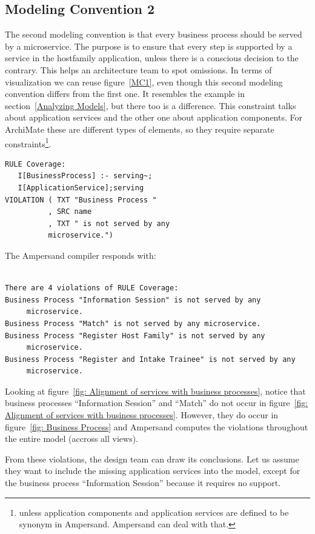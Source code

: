 \documentclass[sn-vancouver]{sn-jnl}%
\theoremstyle{thmstyleone}%
\theoremstyle{thmstyletwo}%
\theoremstyle{thmstylethree}%
\begin{document}
\subsection{Modeling Convention 2}
The second modeling convention is that every business process should be served by a microservice.
The purpose is to ensure that every step is supported by a service in the hostfamily application, unless there is a conscious decision to the contrary.
This helps an architecture team to spot omissions.
In terms of visualization we can reuse figure~\ref{MC1}, even though this second modeling convention differs from the first one.
It resembles the example in section~\ref{Analyzing Models}, but there too is a difference.
This constraint talks about application services and the other one about application components.
For ArchiMate these are different types of elements, so they require separate constraints\footnote{unless application components and application services are defined to be synonym in Ampersand. Ampersand can deal with that.}.

{\small
\begin{lstlisting}[frame=single, label={mc2}, caption={}]
RULE Coverage:
   I[BusinessProcess] :- serving~;
   I[ApplicationService];serving
VIOLATION ( TXT "Business Process "
          , SRC name
          , TXT " is not served by any 
          microservice.")
\end{lstlisting}
}

The Ampersand compiler responds with:

{\small
\begin{verbatim}

There are 4 violations of RULE Coverage:
Business Process "Information Session" is not served by any
     microservice.
Business Process "Match" is not served by any microservice.
Business Process "Register Host Family" is not served by any
     microservice.
Business Process "Register and Intake Trainee" is not served by any
     microservice.

\end{verbatim}
}

Looking at figure~\ref{fig: Alignment of services with business processes},
notice that business processes ``Information Session'' and ``Match'' do not occur in figure~\ref{fig: Alignment of services with business processes}.
However, they do occur in figure~\ref{fig: Business Process} and Ampersand computes the violations throughout the entire model (accross all views).

From these violations, the design team can draw its conclusions.
Let us assume they want to include the missing application services into the model,
except for the business process ``Information Session'' because it requires no support.
\end{document}
